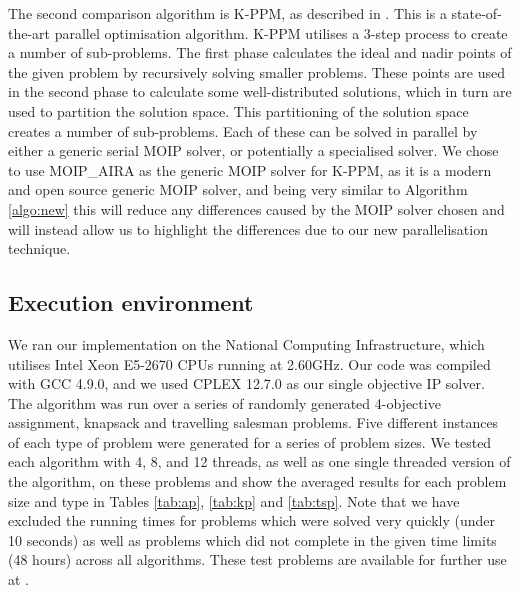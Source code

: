 \documentclass{amsart}
\theoremstyle{definition}
\begin{document}
The second comparison algorithm is K-PPM, as described in \cite{Dhaenens2010KPPM}.
This is a state-of-the-art parallel optimisation algorithm.
K-PPM utilises a 3-step process to create a number of sub-problems.
The first phase calculates the ideal and nadir points of the given problem by recursively solving smaller problems.
These points are used in the second phase to calculate some well-distributed solutions, which in turn are used to partition the solution space.
This partitioning of the solution space creates a number of sub-problems.
Each of these can be solved in parallel by either a generic serial MOIP solver, or potentially a specialised solver.
We chose to use MOIP\_AIRA as the generic MOIP solver for K-PPM, as it is a modern and open source generic MOIP solver, and being very similar to Algorithm \ref{algo:new} this will reduce any differences caused by the MOIP solver chosen and will instead allow us to highlight the differences due to our new parallelisation technique.

\subsection{Execution environment}

We ran our implementation on the National Computing Infrastructure, which utilises Intel Xeon E5-2670 CPUs running at 2.60GHz.
Our code was compiled with GCC 4.9.0, and we used CPLEX 12.7.0 as our single objective IP solver.
The algorithm was run over a series of randomly generated 4-objective assignment, knapsack and travelling salesman problems.
Five different instances of each type of problem were generated for a series of problem sizes.
We tested each algorithm with 4, 8, and 12 threads, as well as one single threaded version of the algorithm, on these problems and show the averaged results for each problem size and type in Tables \ref{tab:ap}, \ref{tab:kp} and \ref{tab:tsp}.
Note that we have excluded the running times for problems which were solved very quickly (under 10 seconds) as well as problems which did not complete in the given time limits (48 hours) across all algorithms.
These test problems are available for further use at \cite{figshare:4obj}.
\end{document}
